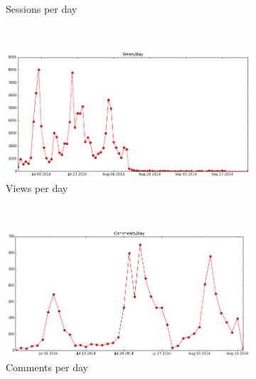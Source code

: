 \documentclass[11pt, oneside]{article}   	%
\begin{document}
\begin{figure}
\begin{subfigure}[b]{0.45\textwidth}
                \caption{Sessions per day}
                \label{sessionsPerDay}
        \end{subfigure}
        ~ %
        \begin{subfigure}[b]{0.45\textwidth}
                \includegraphics[width=\textwidth]{viewsPerDay.png}
                \caption{Views per day}
                \label{viewsPerDay}
        \end{subfigure}
        ~ %
        \begin{subfigure}[b]{0.45\textwidth}
                \includegraphics[width=\textwidth]{commentsPerDay.png}
                \caption{Comments per day}
                \label{commentsPerDay}
        \end{subfigure}
        ~ %
        \begin{subfigure}[b]{0.45\textwidth}

\end{subfigure}
\end{figure}
\end{document}
